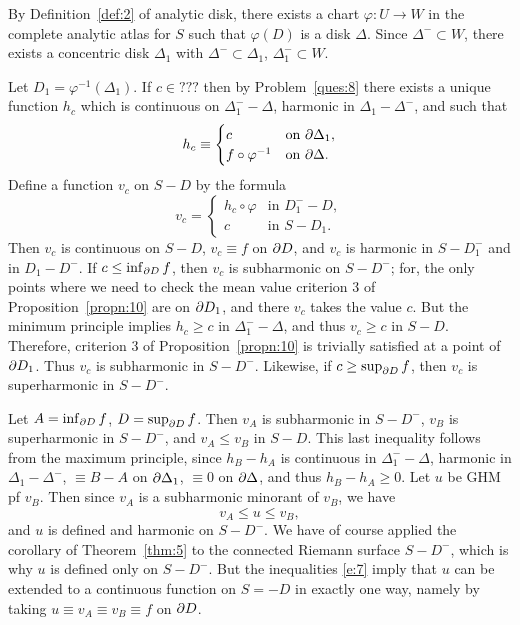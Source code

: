 \documentclass[a4paper,11pt]{article}
\begin{document}
\begin{myproof}
  By Definition~\ref{def:2} of analytic disk, there exists a chart
  $\varphi : U \to W$ in the complete analytic atlas for $S$ such that
  $\varphi(D)$ is a disk $\Delta$.  Since $\Delta^- \subset W$, there
  exists a concentric disk $\Delta_1$ with $\Delta^- \subset
  \Delta_1$, $\Delta_1^- \subset W$.

  \begin{mdframed}
    \vspace{4cm}
  \end{mdframed}

  Let $D_1 = \varphi^{-1}(\Delta_1)$. If $c \in ???$ then by
  Problem~\ref{ques:8} there exists a unique function $h_c$ which is
  continuous on $\Delta_1^- - \Delta$, harmonic in $\Delta_1 -
  \Delta^-$, and such that
  $$
  h_c \equiv
  \begin{cases}
    c &\text{on }\partial \Delta_1,\\
    f\circ \varphi^{-1} &\text{on }\partial \Delta.
  \end{cases}
  $$
  Define a function $v_c$ on $S - D$ by the formula
  $$
  v_c =
  \begin{cases}
    h_c \circ \varphi & \text{in } D_1^- - D,\\
    c & \text{in } S-D_1.
  \end{cases}
  $$
  Then $v_c$ is continuous on $S-D$, $v_c \equiv f$ on $\partial D$, and
  $v_c$ is harmonic in $S - D_1^-$ and in $D_1 - D^-$.  If $c \le
  \inf_{\partial D} f$, then $v_c$ is subharmonic on $S - D^-$; for, the
  only points where we need to check the mean value criterion 3 of
  Proposition~\ref{propn:10} are on $\partial D_1$, and there $v_c$ takes
  the value $c$.  But the minimum principle implies $h_c \ge c$ in
  $\Delta_1^- - \Delta$, and thus $v_c \ge c$ in $S-D$.  Therefore,
  criterion 3 of Proposition~\ref{propn:10} is trivially satisfied at
  a point of $\partial D_1$.  Thus $v_c$ is subharmonic in $S-D^-$.
  Likewise, if $c \ge \sup_{\partial D} f$, then $v_c$ is superharmonic in
  $S - D^-$.

  Let $A = \inf_{\partial D} f$, $D = \sup_{\partial D} f$.   Then $v_A$ is
  subharmonic in $S-D^-$, $v_B$ is superharmonic in $S-D^-$, and $v_A
  \le v_B$ in $S-D$.  This last inequality follows from the maximum
  principle, since $h_B - h_A$ is continuous in $\Delta_1^- - \Delta$,
  harmonic in $\Delta_1 - \Delta^-$, $\equiv B-A$ on $\partial \Delta_1$,
  $\equiv 0$ on $\partial \Delta$, and thus $h_B - h_A \ge 0$.  Let $u$ be
  GHM pf $v_B$.  Then since $v_A$ is a subharmonic minorant of $v_B$,
  we have
  \begin{equation}
    \label{e:7}
    v_A \le u \le v_B,
  \end{equation}
  and $u$ is defined and harmonic on $S - D^-$.  We have of course
  applied the corollary of Theorem~\ref{thm:5} to the connected
  Riemann surface $S - D^-$, which is why $u$ is defined only on $S -
  D^-$.  But the inequalities \eqref{e:7} imply that $u$ can be
  extended to a continuous function on $S =- D$ in exactly one way,
  namely by taking $u \equiv v_A \equiv v_B \equiv f$ on $\partial D$.


\end{myproof}
\end{document}
